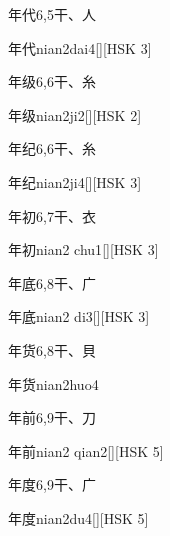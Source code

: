 \begin{entry}{年代}{6,5}{⼲、⼈}
  \begin{phonetics}{年代}{nian2dai4}[][HSK 3]
  \end{phonetics}
\end{entry}

\begin{entry}{年级}{6,6}{⼲、⽷}
  \begin{phonetics}{年级}{nian2ji2}[][HSK 2]
  \end{phonetics}
\end{entry}

\begin{entry}{年纪}{6,6}{⼲、⽷}
  \begin{phonetics}{年纪}{nian2ji4}[][HSK 3]
  \end{phonetics}
\end{entry}

\begin{entry}{年初}{6,7}{⼲、⾐}
  \begin{phonetics}{年初}{nian2 chu1}[][HSK 3]
  \end{phonetics}
\end{entry}

\begin{entry}{年底}{6,8}{⼲、⼴}
  \begin{phonetics}{年底}{nian2 di3}[][HSK 3]
  \end{phonetics}
\end{entry}

\begin{entry}{年货}{6,8}{⼲、⾙}
  \begin{phonetics}{年货}{nian2huo4}
  \end{phonetics}
\end{entry}

\begin{entry}{年前}{6,9}{⼲、⼑}
  \begin{phonetics}{年前}{nian2 qian2}[][HSK 5]
  \end{phonetics}
\end{entry}

\begin{entry}{年度}{6,9}{⼲、⼴}
  \begin{phonetics}{年度}{nian2du4}[][HSK 5]
  \end{phonetics}
\end{entry}

